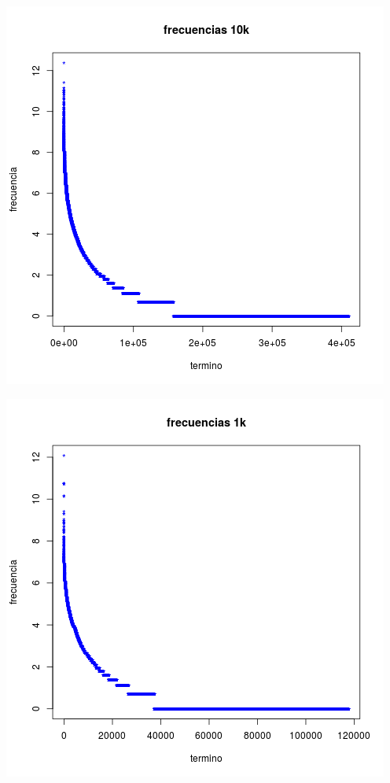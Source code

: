 
\begin{center}\includegraphics{img/frecuencias10k.png}
\end{center}
\begin{center}\includegraphics{img/frecuencias1k.png}
\end{center}

